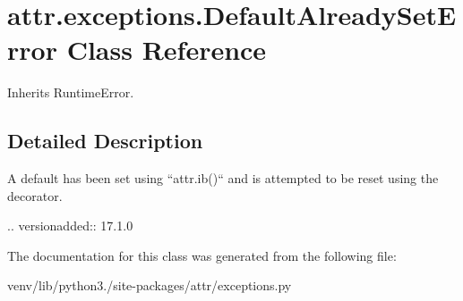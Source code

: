 \hypertarget{classattr_1_1exceptions_1_1_default_already_set_error}{}\section{attr.\+exceptions.\+Default\+Already\+Set\+Error Class Reference}
\label{classattr_1_1exceptions_1_1_default_already_set_error}


Inherits Runtime\+Error.



\subsection{Detailed Description}
\begin{DoxyVerb}A default has been set using ``attr.ib()`` and is attempted to be reset
using the decorator.

.. versionadded:: 17.1.0
\end{DoxyVerb}
 

The documentation for this class was generated from the following file\+:\begin{DoxyCompactItemize}
\item 
venv/lib/python3./site-\/packages/attr/exceptions.\+py\end{DoxyCompactItemize}
